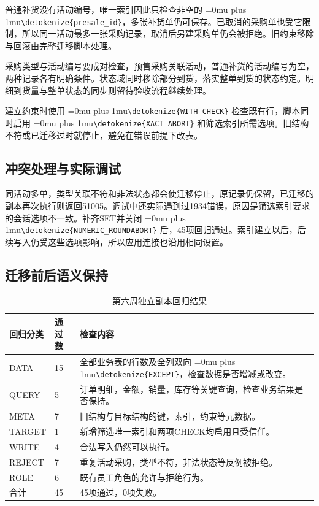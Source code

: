\documentclass{SYSUReport}
\newcommand{\code}[1]{\begingroup\Urlmuskip=0mu plus 1mu\expandafter\nolinkurl\expandafter{\detokenize{#1}}\endgroup}
\begin{document}
普通补货没有活动编号，唯一索引因此只检查非空的 \code{presale_id}，多张补货单仍可保存。已取消的采购单也受它限制，所以同一活动最多一张采购记录，取消后另建采购单仍会被拒绝。旧约束移除与回滚由完整迁移脚本处理。

采购类型与活动编号要成对检查，预售采购关联活动，普通补货的活动编号为空，两种记录各有明确条件。状态域同时移除部分到货，落实整单到货的状态约定。明细到货量与整单状态的同步则留待验收流程继续处理。

建立约束时使用 \code{WITH CHECK} 检查既有行，脚本同时启用 \code{XACT_ABORT} 和筛选索引所需选项。旧结构不符或已迁移过时就停止，避免在错误前提下改表。

\subsection{冲突处理与实际调试}
同活动多单，类型关联不符和非法状态都会使迁移停止，原记录仍保留，已迁移的副本再次执行则返回51005。调试中还实际遇到过1934错误，原因是筛选索引要求的会话选项不一致。补齐SET并关闭 \code{NUMERIC_ROUNDABORT} 后，45项回归通过。索引建立以后，后续写入仍受这些选项影响，所以应用连接也沿用相同设置。

\medskip
\subsection{迁移前后语义保持}
\begin{table}[H]\centering\small
\begin{tabularx}{\textwidth}{P{2.7cm}P{1.2cm}Y}
\toprule 回归分类 & 通过数 & 检查内容 \\
\midrule
DATA & 15 & 全部业务表的行数及全列双向 \code{EXCEPT}，检查数据是否增减或改变。 \\
QUERY & 5 & 订单明细，金额，销量，库存等关键查询，检查业务结果是否保持。 \\
META & 7 & 旧结构与目标结构的键，索引，约束等元数据。 \\
TARGET & 1 & 新增筛选唯一索引和两项CHECK均启用且受信任。 \\
WRITE & 4 & 合法写入仍然可以执行。 \\
REJECT & 7 & 重复活动采购，类型不符，非法状态等反例被拒绝。 \\
ROLE & 6 & 既有员工角色的允许与拒绝行为。 \\
\midrule
合计 & 45 & 45项通过，0项失败。 \\
\bottomrule
\end{tabularx}\caption{第六周独立副本回归结果}
\end{table}
\end{document}
